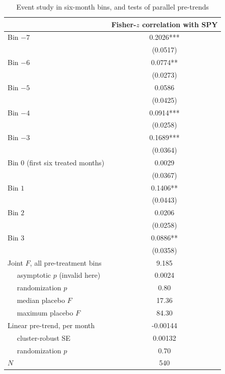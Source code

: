 \begin{table}[t]
\centering
\begin{threeparttable}
\caption{Event study in six-month bins, and tests of parallel pre-trends}
\label{tab:event_study}
\begin{tabular}{lc}
\toprule
 & Fisher-$z$ correlation with SPY \\
\midrule
Bin $-7$ & 0.2026*** \\
 & (0.0517) \\
Bin $-6$ & 0.0774** \\
 & (0.0273) \\
Bin $-5$ & 0.0586 \\
 & (0.0425) \\
Bin $-4$ & 0.0914*** \\
 & (0.0258) \\
Bin $-3$ & 0.1689*** \\
 & (0.0364) \\
Bin $0$ (first six treated months) & 0.0029 \\
 & (0.0367) \\
Bin $1$ & 0.1406** \\
 & (0.0443) \\
Bin $2$ & 0.0206 \\
 & (0.0258) \\
Bin $3$ & 0.0886** \\
 & (0.0358) \\
Joint $F$, all pre-treatment bins & 9.185 \\
$\quad$ asymptotic $p$ (invalid here) & 0.0024 \\
$\quad$ randomization $p$ & 0.80 \\
$\quad$ median placebo $F$ & 17.36 \\
$\quad$ maximum placebo $F$ & 84.30 \\
Linear pre-trend, per month & -0.00144 \\
$\quad$ cluster-robust SE & 0.00132 \\
$\quad$ randomization $p$ & 0.70 \\
$N$ & 540 \\
\bottomrule
\end{tabular}
\begin{tablenotes}[flushleft]
\footnotesize

\end{tablenotes}
\end{threeparttable}
\end{table}
